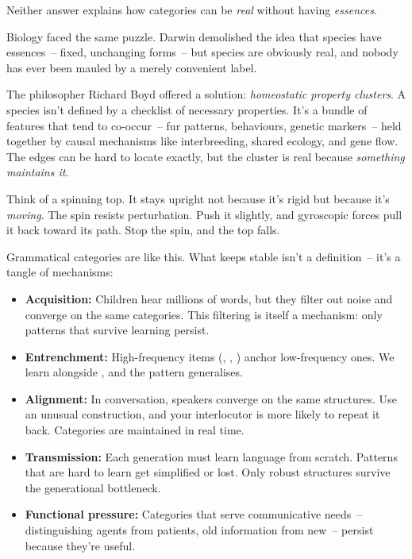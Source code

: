 Neither answer explains how categories can be \emph{real} without having \emph{essences}.

\bigskip

Biology faced the same puzzle. Darwin demolished the idea that species have essences~-- fixed, unchanging forms~-- but species are obviously real, and nobody has ever been mauled by a merely convenient label.

The philosopher Richard Boyd offered a solution: \emph{homeostatic property clusters}. A species isn't defined by a checklist of necessary properties. It's a bundle of features that tend to co-occur~-- fur patterns, behaviours, genetic markers~-- held together by causal mechanisms like interbreeding, shared ecology, and gene flow. The edges can be hard to locate exactly, but the cluster is real because \emph{something maintains it}.

Think of a spinning top. It stays upright not because it's rigid but because it's \emph{moving}. The spin resists perturbation. Push it slightly, and gyroscopic forces pull it back toward its path. Stop the spin, and the top falls.

Grammatical categories are like this. What keeps  stable isn't a definition~-- it's a tangle of mechanisms:

\begin{itemize}
    \item \textbf{Acquisition:} Children hear millions of words, but they filter out noise and converge on the same categories. This filtering is itself a mechanism: only patterns that survive learning persist.
    \item \textbf{Entrenchment:} High-frequency items (, , ) anchor low-frequency ones. We learn  alongside , and the pattern generalises.
    \item \textbf{Alignment:} In conversation, speakers converge on the same structures. Use an unusual construction, and your interlocutor is more likely to repeat it back. Categories are maintained in real time.
    \item \textbf{Transmission:} Each generation must learn language from scratch. Patterns that are hard to learn get simplified or lost. Only robust structures survive the generational bottleneck.
    \item \textbf{Functional pressure:} Categories that serve communicative needs~-- distinguishing agents from patients, old information from new~-- persist because they're useful.
\end{itemize}

